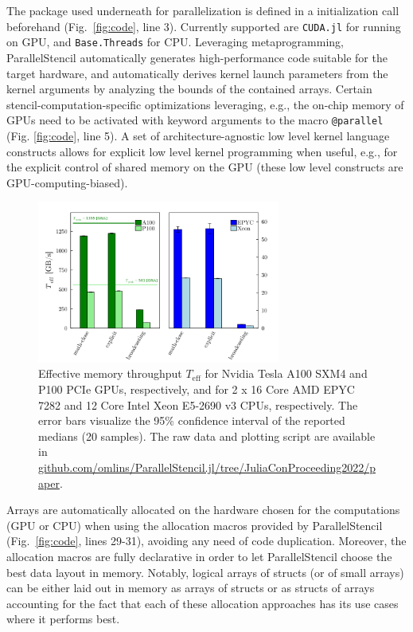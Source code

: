 \documentclass{juliacon}
\begin{document}
The package used underneath for parallelization is defined in a initialization call beforehand (Fig.~\ref{fig:code}, line 3). Currently supported are \texttt{CUDA.jl} \cite{besard2018effective} for running on GPU, and \texttt{Base.Threads} for CPU. Leveraging metaprogramming, ParallelStencil automatically generates high-performance code suitable for the target hardware, and automatically derives kernel launch parameters from the kernel arguments by analyzing the bounds of the contained arrays. Certain stencil-computation-specific optimizations leveraging, e.g., the on-chip memory of GPUs need to be activated with keyword arguments to the macro \texttt{@parallel} (Fig. \ref{fig:code}, line 5). A set of architecture-agnostic low level kernel language constructs allows for explicit low level kernel programming when useful, e.g., for the explicit control of shared memory on the GPU (these low level constructs are GPU-computing-biased). 

\begin{figure}[t]
    \centerline{\includegraphics[width=8cm]{julia_xpu_Teff.png}}
    \caption{Effective memory throughput $T_\mathrm{eff}$ for Nvidia Tesla A100 SXM4 and P100 PCIe GPUs, respectively, and for 2 x 16 Core AMD EPYC 7282 and 12 Core Intel Xeon E5-2690 v3 CPUs, respectively. The error bars visualize the 95\% confidence interval of the reported medians (20 samples). The raw data and plotting script are available in \url{github.com/omlins/ParallelStencil.jl/tree/JuliaConProceeding2022/paper}.}
	\label{fig:performance}
\end{figure}

Arrays are automatically allocated on the hardware chosen for the computations (GPU or CPU) when using the allocation macros provided by ParallelStencil (Fig.~\ref{fig:code}, lines 29-31), avoiding any need of code duplication. Moreover, the allocation macros are fully declarative in order to let ParallelStencil choose the best data layout in memory. Notably, logical arrays of structs (or of small arrays) can be either laid out in memory as arrays of structs or as structs of arrays accounting for the fact that each of these allocation approaches has its use cases where it performs best.
\end{document}

